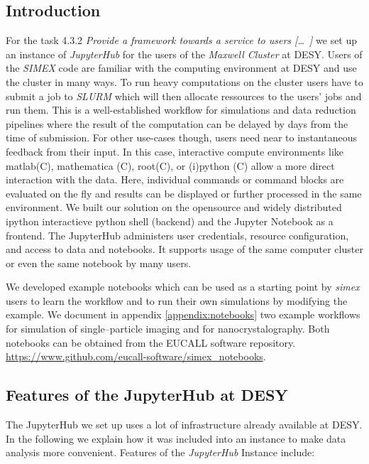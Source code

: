 \documentclass[10pt]{scrartcl}
\begin{document}
\subsection{Introduction}
For the task 4.3.2 \textit{Provide a framework towards a service to users [\dots\ ] } we set up an instance of \textit{JupyterHub} for the users of the \textit{Maxwell Cluster} at \textsc{DESY}.
Users of the \textit{SIMEX} code are familiar with the computing environment at \textsc{DESY} and use the cluster in many ways.
To run heavy computations on the cluster users have to submit a job to \textit{SLURM} which will then allocate ressources to the users' jobs and run them.
This is a well-established workflow for simulations and data reduction pipelines where the result of the
computation can be delayed by days from the time of submission.
For other use-cases though, users need near to instantaneous feedback from their input.
In this case, interactive compute environments like matlab(C), mathematica (C),
root(C), or (i)python (C) allow a more direct interaction with the data.
Here, individual commands or command blocks are
evaluated on the fly and results can be displayed or further processed in the same
environment. We built our solution on the opensource and widely distributed
ipython interactieve python shell (backend) and the Jupyter Notebook as a
frontend.
The JupyterHub administers user credentials, resource configuration, and access
to data and notebooks. It supports usage of the same computer cluster or even the same notebook
by many users.

We developed example notebooks which can be used as a starting point by
\textit{simex} users to learn the workflow and to run their own simulations by
modifying the example. We document in appendix \ref{appendix:notebooks}
two example workflows for simulation of
single--particle imaging and for nanocrystalography. Both notebooks can be
obtained from the EUCALL software repository.
\url{https://www.github.com/eucall-software/simex_notebooks}.

\subsection{Features of the JupyterHub at DESY}
The JupyterHub we set up uses a lot of infrastructure already available at DESY.
In the following we explain how it was included into an instance to make data analysis more convenient.
Features of the \textit{JupyterHub} Instance include:
\end{document}
